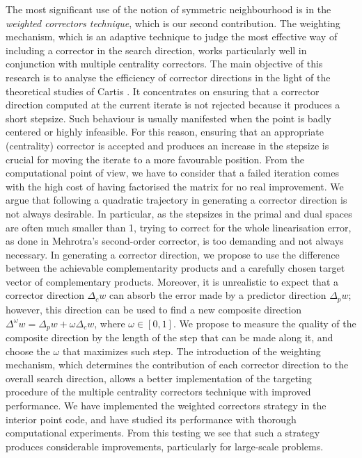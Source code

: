 The most significant use of the notion of symmetric neighbourhood
is in the {\em weighted correctors technique},
which is our second contribution.
The weighting mechanism, which is an adaptive technique to judge the
most effective way of including a corrector in the search direction, 
works particularly well in conjunction with multiple centrality
correctors.
The main objective of this research is to analyse the efficiency of
corrector directions in the light of the theoretical studies of Cartis
\cite{Cartis04,Cartis05}. It concentrates on ensuring that a corrector
direction computed at the current iterate is not rejected because it
produces a short stepsize. Such behaviour is usually manifested when
the point is badly centered or highly infeasible.
For this reason, ensuring that an appropriate (centrality) corrector
is accepted and produces an increase in the stepsize is crucial
for moving the iterate to a more favourable position.
From the computational point of view, we have to consider that
a failed iteration comes with the high cost of having factorised
the matrix for no real improvement.
We argue that following a quadratic trajectory in generating a
corrector direction is not always desirable. In particular, as the stepsizes 
in the primal and dual spaces are often much smaller than 1,
trying to correct for the whole linearisation error,
as done in Mehrotra's second-order corrector, is too
demanding and not always necessary.
In generating a corrector direction, we propose to use 
the difference between the achievable complementarity products 
and a carefully chosen target vector of complementary products.
Moreover, it is unrealistic to expect that a corrector direction $\Delta_c w$
can absorb the error made by a predictor direction $\Delta_p w$;
however, this direction can be used to find a new composite
direction $\Delta^\omega w = \Delta_p w + \omega\Delta_c w$, where
$\omega \in [0,1]$.
We propose to measure the quality of the composite direction
by the length of the step that can be made along it, and choose
the $\omega$ that maximizes such step.
The introduction of the weighting mechanism, which determines
the contribution of each corrector direction to the overall
search direction, allows a better implementation
of the targeting procedure of the multiple centrality correctors technique
with improved performance.
We have implemented the weighted correctors strategy in the \HOPDM
interior point code, and have studied its performance with thorough
computational experiments. 
From this testing we see that such a strategy 
produces considerable improvements, particularly for large-scale
problems.


